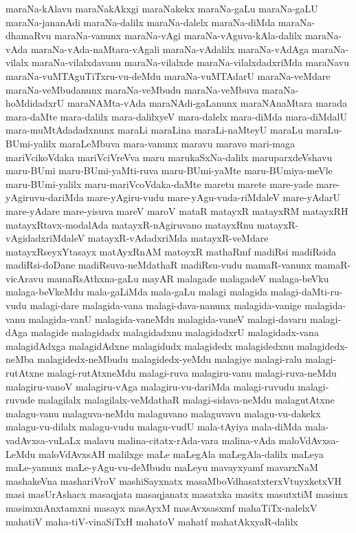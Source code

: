 {maraNa-kAlavu
maraNakAkxgi
maraNakekx
maraNa-gaLu
maraNa-gaLU
maraNa-jananAdi
maraNa-dalilx
maraNa-dalelx
maraNa-diMda
maraNa-dhamaRvu
maraNa-vanunx
maraNa-vAgi
maraNa-vAguva-kAla-dalilx
maraNa-vAda
maraNa-vAda-naMtara-vAgali
maraNa-vAdalilx
maraNa-vAdAga
maraNa-vilalx
maraNa-vilalxdavanu
maraNa-vilalxde
maraNa-vilalxdadxriMda
maraNavu
maraNa-vuMTAguTiTxru-vu-deMdu
maraNa-vuMTAdarU
maraNa-veMdare
maraNa-veMbudanunx
maraNa-veMbudu
maraNa-veMbuva
maraNa-hoMdidadxrU
maraNAMta-vAda
maraNAdi-gaLanunx
maraNAnaMtara
marada
mara-daMte
mara-dalilx
mara-dalilxyeV
mara-dalelx
mara-diMda
mara-diMdalU
mara-muMtAdadadxnunx
maraLi
maraLina
maraLi-naMteyU
maraLu
maraLu-BUmi-yalilx
maraLeMbuva
mara-vanunx
maravu
maravo
mari-maga
mariVcikoVdaka
mariVciVreVva
maru
marukaSxNa-dalilx
maruparxdeVshavu
maru-BUmi
maru-BUmi-yaMti-ruva
maru-BUmi-yaMte
maru-BUmiya-meVle
maru-BUmi-yalilx
maru-mariVcoVdaka-daMte
maretu
marete
mare-yade
mare-yAgiruvu-dariMda
mare-yAgiru-vudu
mare-yAgu-vuda-riMdaleV
mare-yAdarU
mare-yAdare
mare-yisuva
mareV
maroV
mataR
matayxR
matayxRM
matayxRH
matayxRtavx-modalAda
matayxR-nAgiruvano
matayxRnu
matayxR-vAgidadxriMdaleV
matayxR-vAdadxriMda
matayxR-veMdare
matayxRseyxYtasayx
matAyxRnAM
matoyxR
mathaRmf
madiRsi
madiRsida
madiRsi-doDane
madiRsuva-neMdathaR
madiRsu-vudu
mamaR-vanunx
mamaR-vicAravu
mamaRsAthxna-gaLu
mayAR
malagade
malagadeV
malaga-beVku
malaga-beVkeMdu
mala-gaLiMda
mala-gaLu
malagi
malagida
malagi-daMti-ru-vudu
malagi-dare
malagida-vana
malagi-dava-nanunx
malagida-vanige
malagida-vanu
malagida-vanU
malagida-vaneMdu
malagida-vaneV
malagi-davaru
malagi-dAga
malagide
malagidadx
malagidadxnu
malagidadxrU
malagidadx-vana
malagidAdxga
malagidAdxne
malagidudx
malagidedx
malagidedxnu
malagidedx-neMba
malagidedx-neMbudu
malagidedx-yeMdu
malagiye
malagi-ralu
malagi-rutAtxne
malagi-rutAtxneMdu
malagi-ruva
malagiru-vanu
malagi-ruva-neMdu
malagiru-vanoV
malagiru-vAga
malagiru-vu-dariMda
malagi-ruvudu
malagi-ruvude
malagilalx
malagilalx-veMdathaR
malagi-sidava-neMdu
malagutAtxne
malagu-vanu
malaguva-neMdu
malaguvano
malaguvavu
malagu-vu-dakekx
malagu-vu-dilalx
malagu-vudu
malagu-vudU
mala-tAyiya
mala-diMda
mala-vadAvxsa-vuLaLx
malavu
malina-citatx-rAda-vara
malina-vAda
maloVdAvxsa-LeMdu
maloVdAvxsAH
malilxge
maLe
maLegAla
maLegAla-dalilx
maLeya
maLe-yanunx
maLe-yAgu-vu-deMbudu
maLeyu
mavayxyamf
mavarxNaM
mashakeVna
mashariVroV
mashiSayxnatx
masaMboVdhasatxterxVtuyxketxVH
masi
masUrAshacx
masaqjata
masaqjanatx
masatxka
masitx
masutxtiM
masimx
masimxnAnxtamxni
masayx
masAyxM
masAvxsasxmf
mahaTiTx-nalelxV
mahatiV
maha-tiV-vinaSiTxH
mahatoV
mahatf
mahatAkxyaR-dalilx
}
